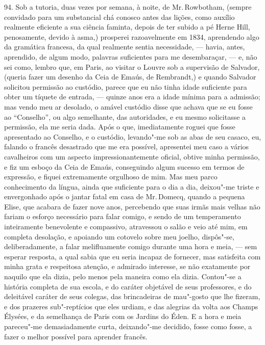 94. Sob a tutoria, duas vezes por semana, à noite, de Mr.\,Rowbotham,
(sempre convidado para um substancial chá conosco antes das lições, como
auxílio realmente eficiente a sua ciência faminta, depois de ter subido
a pé Herne Hill, penosamente, devido à asma,) prosperei razoavelmente em
1834, aprendendo algo da gramática francesa, da qual realmente sentia
necessidade, --- havia, antes, aprendido, de algum modo, palavras
suficientes para me desembaraçar, --- e, não sei como, lembro que, em
Paris, ao visitar o Louvre sob a supervisão de Salvador, (queria fazer
um desenho da Ceia de Emaús, de Rembrandt,) e quando Salvador solicitou
permissão ao custódio, parece que eu não tinha idade suficiente para
obter um tíquete de entrada, --- quinze anos era a idade mínima para a
admissão; mas vendo meu ar desolado, o amável custódio disse que achava
que se eu fosse ao ``Conselho'', ou algo semelhante, das autoridades, e
eu mesmo solicitasse a permissão, ela me seria dada. Após o que,
imediatamente roguei que fosse apresentado ao Conselho, e o custódio,
levando"-me sob as abas de seu casaco, eu, falando o francês desastrado
que me era possível, apresentei meu caso a vários cavalheiros com um
aspecto impressionantemente oficial, obtive minha permissão, e fiz um
esboço da Ceia de Emaús, conseguindo algum sucesso em termos de
expressão, e fiquei extremamente orgulhoso de mim. Mas meu parco
conhecimento da língua, ainda que suficiente para o dia a dia, deixou"-me
triste e envergonhado após o jantar fatal em casa de Mr.\,Domecq, quando a
pequena Elise, que acabara de fazer nove anos, percebendo que suas irmãs
mais velhas não fariam o esforço necessário para falar comigo, e sendo
de um temperamento inteiramente benevolente e compassivo, atravessou o
salão e veio até mim, em completa desolação, e apoiando um cotovelo
sobre meu joelho, dispôs"-se, deliberadamente, a falar melifluamente
comigo durante uma hora e meia, --- sem esperar resposta, a qual sabia
que eu seria incapaz de fornecer, mas satisfeita com minha grata e
respeitosa atenção, e admirado interesse, se não exatamente por naquilo
que ela dizia, pelo menos pela maneira como ela dizia. Contou"-se a
história completa de sua escola, e do caráter objetável de seus
professores, e do deleitável caráter de seus colegas, das brincadeiras
de mau"-gosto que lhe fizeram, e dos prazeres sub"-reptícios que eles
urdiam, e das alegrias da volta aos Champs Élysées, e da semelhança de
Paris com os Jardins do Éden. E a hora e meia pareceu"-me demasiadamente
curta, deixando"-me decidido, fosse como fosse, a fazer o melhor possível
para aprender francês.

